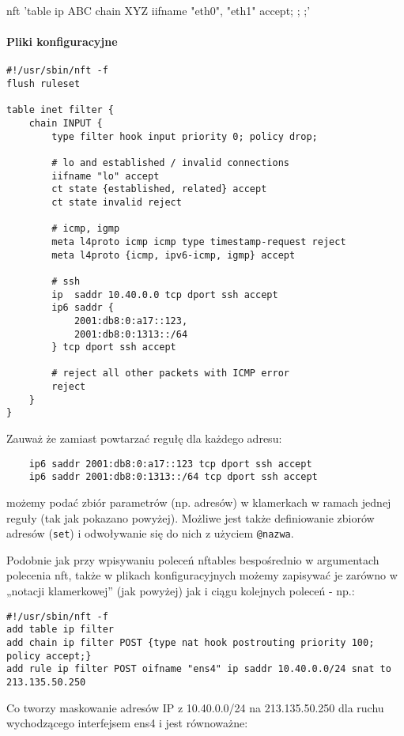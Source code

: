 \begin{CodeFrame*}[bash]{}
nft 'table ip ABC { chain XYZ { iifname {"eth0", "eth1"} accept; }; };'
\end{CodeFrame*}

\paragraph{Pliki konfiguracyjne}

\begin{Verbatim}
#!/usr/sbin/nft -f
flush ruleset

table inet filter {
	chain INPUT {
		type filter hook input priority 0; policy drop;
		
		# lo and established / invalid connections
		iifname "lo" accept
		ct state {established, related} accept
		ct state invalid reject
		
		# icmp, igmp
		meta l4proto icmp icmp type timestamp-request reject
		meta l4proto {icmp, ipv6-icmp, igmp} accept
		
		# ssh
		ip  saddr 10.40.0.0 tcp dport ssh accept
		ip6 saddr {
			2001:db8:0:a17::123,
			2001:db8:0:1313::/64
		} tcp dport ssh accept
		
		# reject all other packets with ICMP error
		reject
	}
}
\end{Verbatim}

\noindent Zauważ że zamiast powtarzać regułę dla każdego adresu:
\begin{Verbatim}
	ip6 saddr 2001:db8:0:a17::123 tcp dport ssh accept
	ip6 saddr 2001:db8:0:1313::/64 tcp dport ssh accept
\end{Verbatim}
możemy podać zbiór parametrów (np. adresów) w klamerkach w ramach jednej reguły (tak jak pokazano powyżej).
Możliwe jest także definiowanie zbiorów adresów (\Verb$set$) i odwoływanie się do nich z użyciem \Verb$@nazwa$.

Podobnie jak przy wpisywaniu poleceń nftables bespośrednio w argumentach polecenia nft, także w plikach konfiguracyjnych możemy zapisywać je zarówno w „notacji klamerkowej” (jak powyżej) jak i ciągu kolejnych poleceń - np.:

\begin{Verbatim}
#!/usr/sbin/nft -f
add table ip filter
add chain ip filter POST {type nat hook postrouting priority 100; policy accept;}
add rule ip filter POST oifname "ens4" ip saddr 10.40.0.0/24 snat to 213.135.50.250
\end{Verbatim}

\noindent Co tworzy maskowanie adresów IP z 10.40.0.0/24 na 213.135.50.250 dla ruchu wychodzącego interfejsem ens4 i jest równoważne:

